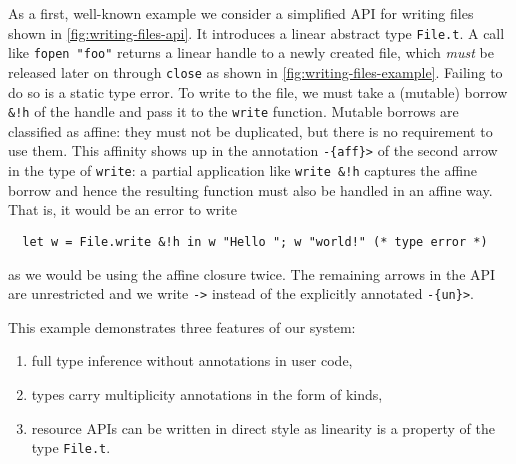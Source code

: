 As a first, well-known example we consider a simplified API for
writing files shown in \cref{fig:writing-files-api}.  It introduces a
linear abstract type \lstinline/File.t/. A call like
\lstinline/fopen "foo"/ returns a linear handle to a newly created
file, which \emph{must} be released later on through \lstinline/close/
as shown in \cref{fig:writing-files-example}. Failing to do so is a
static type error.  To write to the file, we must take a (mutable)
borrow \lstinline/&!h/ of the handle and pass it to the
\lstinline/write/ function. Mutable borrows are classified as affine:
they must not be duplicated, but there is no requirement to use
them. This affinity shows up in the annotation \lstinline/-{aff}>/ of the second arrow in
the type of \lstinline/write/: a partial application like
\lstinline/write &!h/ captures the affine borrow and hence the
resulting function must also be handled in an affine way. That is, it
would be an error to write
\begin{lstlisting}
  let w = File.write &!h in w "Hello "; w "world!" (* type error *)
\end{lstlisting}
as we would be using the affine closure twice. The remaining arrows in
the API are unrestricted and we write \lstinline/->/ instead of the
explicitly annotated \lstinline/-{un}>/.


This example demonstrates three features of our system:
\begin{enumerate}
\item full type inference without annotations in user code,
\item types carry multiplicity annotations in the form of kinds,
\item resource APIs can be written in direct style as linearity is a
  property of the type \lstinline/File.t/.
\end{enumerate}

